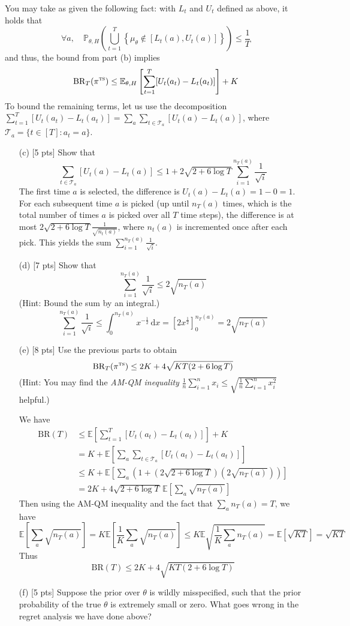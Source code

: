 \documentclass[11pt]{article}
\newcommand{\E}{\mathbb E}
\newcommand{\Ex}{\mathbb E}
\renewcommand{\P}{\mathbb{P}}
\renewcommand{\d}[1]{\,\mathrm{d}#1}
\newcommand{\piTS}{\pi^{\textsc{ts}}}
\newcommand{\solution}[1]{{\color{red} #1}}
\begin{document}
You may take as given the following fact: with $L_t$ and $U_t$ defined as above, it holds that
$$
\forall a, \quad \P_{\theta, H}\left(\bigcup_{t=1}^T \left\{ \mu_\theta \not \in [L_t(a), U_t(a)] \right\}\right) \leq \frac{1}{T}
$$
and thus, the bound from part (b) implies
\begin{equation}
\text{BR}_T(\piTS) \le \E_{\theta, H}\left[\sum_{t=1}^T [U_t(a_t) - L_t(a_t)]\right] + K
\end{equation}
To bound the remaining terms, let us use the decomposition $\sum_{t=1}^T [U_t(a_t) - L_t(a_t)] = \sum_a \sum_{t \in \mathcal{T}_a} [U_t(a) - L_t(a)]$, where $\mathcal{T}_a = \{t \in [T] : a_t = a\}$.

\begin{enumerate}
\item[(c)]
[5 pts]
Show that
$$
\sum_{t \in \mathcal{T}_a} [U_t(a) - L_t(a)] \le 1 + 2 \sqrt{2 + 6 \log T} \sum_{i=1}^{n_T(a)} \frac{1}{\sqrt{i}}
$$
\solution{
The first time $a$ is selected, the difference is $U_t(a) - L_t(a) = 1 - 0 = 1$. For each subsequent time $a$ is picked (up until $n_T(a)$ times, which is the total number of times $a$ is picked over all $T$ time steps), the difference is at most $2 \sqrt{2 + 6 \log T} \frac{1}{\sqrt{n_t(a)}}$, where $n_t(a)$ is incremented once after each pick. This yields the sum $\sum_{i=1}^{n_T(a)} \frac{1}{\sqrt{i}}$.
}

\item[(d)]
[7 pts]
Show that
$$
\sum_{i=1}^{n_T(a)} \frac{1}{\sqrt{i}} \le 2\sqrt{n_T(a)}
$$
(Hint: Bound the sum by an integral.)
\solution{
$$
\sum_{i=1}^{n_T(a)} \frac{1}{\sqrt{i}} \le \int_0^{n_T(a)} x^{-\frac{1}{2}} \d{x} = [2x^{\frac{1}{2}}]_0^{n_T(a)} = 2\sqrt{n_T(a)}
$$
}

\item[(e)]
[8 pts]
Use the previous parts to obtain
$$
\text{BR}_T(\piTS) \le 2K + 4 \sqrt{KT(2 + 6 \log T)}
$$
(Hint: You may find the \textit{AM-QM inequality} $\frac{1}{n} \sum_{i=1}^n x_i \le \sqrt{\frac{1}{n} \sum_{i=1}^n x_i^2}$ helpful.)

\solution{
We have
\begin{align*}
\text{BR}(T) &\le \E\left[\sum_{t=1}^T [U_t(a_t) - L_t(a_t)]\right] + K \tag{eqn. 5} \\
&= K + \E\left[\sum_a \sum_{t \in \mathcal{T}_a} [U_t(a_t) - L_t(a_t)]\right] \\
&\le K + \E\left[\sum_a \left(1 + (2\sqrt{2 + 6\log T})(2\sqrt{n_T(a)})\right)\right] \tag{by parts (c) and (d)} \\
&= 2K + 4\sqrt{2 + 6 \log T} \, \E\left[\sum_a\sqrt{n_T(a)}\right]
\end{align*}
Then using the AM-QM inequality and the fact that $\sum_a n_T(a) = T$, we have
$$
\E\left[\sum_a \sqrt{n_T(a)}\right] = K \E\left[\frac{1}{K}\sum_a \sqrt{n_T(a)}\right] \le K \E\sqrt{\frac{1}{K} \sum_a n_T(a)} = \Ex[\sqrt{KT}] = \sqrt{KT}
$$
Thus
$$
\text{BR}(T) \le 2K + 4\sqrt{KT(2 + 6\log T)}
$$
}

\item[(f)]
[5 pts]
Suppose the prior over $\theta$ is wildly misspecified, such that the prior probability of the true $\theta$ is extremely small or zero. What goes wrong in the regret analysis we have done above?
\end{enumerate}


 

\end{document}
